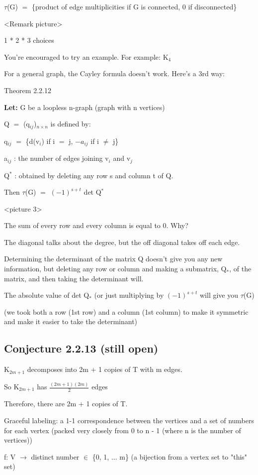 \documentclass{article}
\newcommand{\mt}[1]{\ensuremath{#1}}
\newcommand\ssc[2][\DefaultOpt]{%
  \def\DefaultOpt{#2}%
  \subsection[#1]{#2}%
}
\newcommand{\lt}[1]{\textbf{Let: } #1}
\newcommand{\mem}{\mt{\in} }
\newcommand{\lra}{ \mt{\longrightarrow} } %
\newcommand{\prn}[1]{(#1)}
\newcommand{\bk}[1]{\{#1\}}
\newcommand{\ps}{\mt{\operatorname{+}} }
\newcommand{\ms}{\mt{\operatorname{-}} }
\newcommand{\eql}{ \mt{\operatorname{=}} }
\newcommand{\uw}[2]{#1\mt{_{#2}}}
\newcommand{\uf}[2]{#1\mt{^{#2}}}
\newcommand{\frc}[2]{\mt{\frac{#1}{#2}}}
\begin{document}
{$\tau$(G) \eql \bk{product of edge multiplicities if G is connected, 0 if disconnected}

<Remark picture>

1 * 2 * 3 choices

You're encouraged to try an example. For example: \uw{K}{4}

For a general graph, the Cayley formula doesn't work. Here's a 3rd way:

Theorem 2.2.12

\lt{G be a loopless n-graph (graph with n vertices)}

Q \eql \prn{\uw{q}{ij}}$_{n\times n}$ is defined by:

\uw{q}{ij} \eql \bk{d(\uw{v}{i}) if i \eql j, $-a_{ij}$ if i $\neq$ j}

\uw{a}{ij} : the number of edges joining \uw{v}{i} and \uw{v}{j}

\uf{Q}{*} : obtained by deleting any row s and column t of Q.

Then $\tau$(G) \eql $(-1)^{s + t}$ det \uf{Q}{*}

<picture 3>

The sum of every row and every column is equal to 0. Why?

The diagonal talks about the degree, but the off diagonal takes off each edge.

Determining the determinant of the matrix Q doesn't give you any new information, but deleting any row or column and making a submatrix, \uw{Q}{*}, of the matrix, and then taking the determinant will.

The absolute value of det \uw{Q}{*} (or just multiplying by $(-1)^{s + t}$ will give you $\tau$(G)

(we took both a row (1st row) and a column (1st column) to make it symmetric and make it easier to take the determinant)

\ssc{Conjecture 2.2.13 (still open)}{

\uw{K}{2m + 1} decomposes into 2m \ps 1 copies of T with m edges.

So \uw{K}{2m + 1} has \frc{(2m + 1)(2m)}{2} edges

Therefore, there are 2m \ps 1 copies of T.

}

Graceful labeling: a 1-1 correspondence between the vertices and a set of numbers for each vertex (packed very closely from 0 to n \ms 1 (where n is the number of vertices))

f: V \lra distinct number \mem \bk{0, 1, ... m} (a bijection from a vertex set to "this" set)

}
\end{document}

